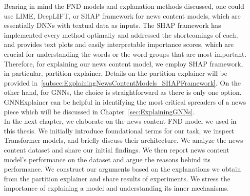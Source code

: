 Bearing in mind the FND models and explanation methods discussed, one could use LIME, DeepLIFT, or SHAP framework for news content models, which are essentially DNNs with textual data as inputs. The SHAP framework has implemented every method optimally and addressed the shortcomings of each, and provides text plots and easily interpretable importance scores, which are crucial for understanding the words or the word groups that are most important. Therefore, for explaining our news content model, we employ SHAP framework, in particular, partition explainer. Details on the partition explainer will be provided in~\ref{subsec:ExplainingNewsContentModels_SHAPFramework}. On the other hand, for GNNs, the choice is straightforward as there is only one option. GNNExplainer can be helpful in identifying the most critical spreaders of a news piece which will be discussed in Chapter~\ref{sec:ExplainingGNNs}.\\
In the next chapter, we elaborate on the news content FND model we used in this thesis. We initially introduce foundational terms for our task, we inspect Transformer models, and briefly discuss their architecture. We analyze the news content dataset and share our initial findings. We then report news content model's performance on the dataset and argue the reasons behind its performance. We construct our arguments based on the explanations we obtain from the partition explainer and share results of experiments. We stress the importance of explaining a model and understanding its inner mechanisms.
